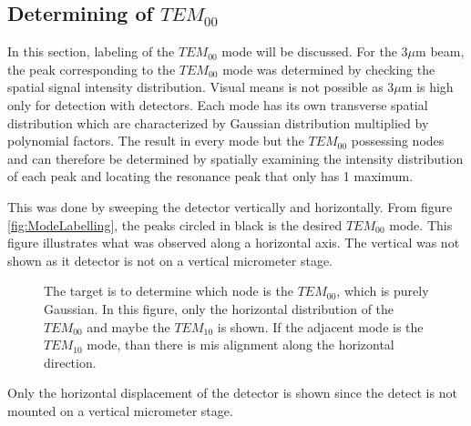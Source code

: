 \documentclass[a4paper]{book}
\begin{document}
\subsection{Determining of $TEM_{00}$}
\label{ssec:ModeLabeling}
In this section, labeling of the $TEM_{00}$ mode will be discussed. For the 3$\mu$m beam, the peak corresponding to the $TEM_{00}$ mode was determined by checking the spatial signal intensity distribution. Visual means is not possible as 3$\mu$m is high only for detection with detectors. Each mode has its own transverse spatial distribution which are characterized by Gaussian distribution multiplied by polynomial factors. The result in every mode but the $TEM_{00}$ possessing nodes and can therefore be determined by spatially examining the intensity distribution of each peak and locating the resonance peak that only has 1 maximum. 

This was done by sweeping the detector vertically and horizontally. From figure \ref{fig:ModeLabelling}, the peaks circled in black is the desired $TEM_{00}$ mode. This figure illustrates what was observed along a horizontal axis. The vertical was not shown as it detector is not on a vertical micrometer stage.

\begin{figure} [!ht]
	\centering
	\def\svgwidth{\columnwidth}
	\resizebox{160mm}{!}{}
	\caption{The target is to determine which node is the $TEM_{00}$, which is purely Gaussian. In this figure, only the horizontal distribution of the $TEM_{00}$ and maybe the $TEM_{10}$ is shown. If the adjacent mode is the $TEM_{10}$ mode, than there is mis alignment along the horizontal direction.}
	\label{fig:mode-label}
\end{figure}

Only the horizontal displacement of the detector is shown since the detect is not mounted on a vertical micrometer stage.

						
						
						
						
						
		
\end{document}
